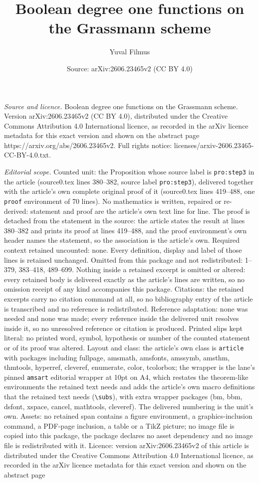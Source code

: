 \documentclass[10pt,a4paper]{amsart}
\title[Boolean degree one functions on the Grassmann scheme]{Boolean degree one functions on the Grassmann scheme}
\author{Yuval Filmus}
\date{Source: arXiv:2606.23465v2 (CC BY 4.0)}
\begin{document}
\maketitle

\noindent\emph{Source and licence.} Boolean degree one functions on the Grassmann scheme. Version arXiv:2606.23465v2 (CC BY 4.0), distributed under the Creative Commons Attribution 4.0 International licence, as recorded in the arXiv licence metadata for this exact version and shown on the abstract page https://arxiv.org/abs/2606.23465v2. Full rights notice: licenses/arxiv-2606.23465-CC-BY-4.0.txt.\par\smallskip

\noindent\textit{Editorial scope.} Counted unit: the Proposition whose source label is \texttt{pro:step3} in the article (source0.tex lines 380--382, source label \texttt{pro:step3}), delivered together with the article's own complete original proof of it (source0.tex lines 419--488, one \texttt{proof} environment of 70 lines). No mathematics is written, repaired or re-derived: statement and proof are the article's own text line for line. The proof is detached from the statement in the source: the article states the result at lines 380--382 and prints its proof at lines 419--488, and the proof environment's own header names the statement, so the association is the article's own. Required context retained uncounted: none. Every definition, display and label of those lines is retained unchanged. Omitted from this package and not redistributed: 1--379, 383--418, 489--699. Nothing inside a retained excerpt is omitted or altered: every retained body is delivered exactly as the article's lines are written, so no omission receipt of any kind accompanies this package. Citations: the retained excerpts carry no citation command at all, so no bibliography entry of the article is transcribed and no reference is redistributed. Reference adaptation: none was needed and none was made; every reference inside the delivered unit resolves inside it, so no unresolved reference or citation is produced. Printed slips kept literal: no printed word, symbol, hypothesis or number of the counted statement or of its proof was altered. Layout and class: the article's own class is \texttt{article} with packages including fullpage, amsmath, amsfonts, amssymb, amsthm, thmtools, hyperref, cleveref, enumerate, color, tcolorbox; the wrapper is the lane's pinned \texttt{amsart} editorial wrapper at 10pt on A4, which restates the theorem-like environments the retained text needs and adds the article's own macro definitions that the retained text needs (\texttt{\textbackslash subs}), with extra wrapper packages (bm, bbm, dsfont, xspace, cancel, mathtools, cleveref). The delivered numbering is the unit's own. Assets: no retained span contains a figure environment, a graphics-inclusion command, a PDF-page inclusion, a table or a TikZ picture; no image file is copied into this package, the package declares no asset dependency and no image file is redistributed with it. Licence: version arXiv:2606.23465v2 of this article is distributed under the Creative Commons Attribution 4.0 International licence, as recorded in the arXiv licence metadata for this exact version and shown on the abstract page 
\end{document}
